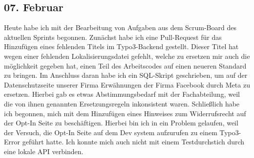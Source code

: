 \subsection{07. Februar}
Heute habe ich mit der Bearbeitung von Aufgaben aus dem Scrum-Board des aktuellen Sprints begonnen. Zunächst habe ich eine Pull-Request für das Hinzufügen eines fehlenden Titels im Typo3-Backend gestellt. Dieser Titel hat wegen einer fehlenden Lokalisierungsdatei gefehlt, welche zu ersetzen mir auch die möglichkeit gegeben hat, einen Teil des Arbeitscodes auf einen neueren Standard zu bringen. Im Anschluss daran habe ich ein SQL-Skript geschrieben, um auf der Datenschutzseite unserer Firma Erwähnungen der Firma Facebook durch Meta zu ersetzen. Hierbei gab es etwas Abstimmungsbedarf mit der Fachabteilung, weil die von ihnen genannten Ersetzungsregeln inkonsistent waren. Schließlich habe ich begonnen, mich mit dem Hinzufügen eines Hinweises zum Widerrufsrecht auf der Opt-In Seite zu beschäftigen. Hierbei bin ich in ein Problem gelaufen, weil der Versuch, die Opt-In Seite auf dem Dev system aufzurufen zu einem Typo3-Error geführt hatte. Ich konnte mich auch nicht mit einem Testdurchstich durch eine lokale API verbinden. 